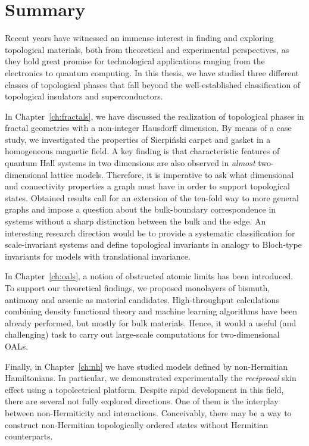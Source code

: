 \cleardoublepage{}
\chapter*{Summary}
\label{ch:summary}
Recent years have witnessed an immense interest in finding and exploring topological materials, both from theoretical and experimental perspectives, as they hold great promise for technological applications ranging from the electronics to quantum computing. In this thesis, we have studied three different classes of topological phases that fall beyond the well-established classification of topological insulators and superconductors.

In Chapter~\ref{ch:fractals}, we have discussed the realization of topological phases in fractal geometries with a non-integer Hausdorff dimension. By means of a case study, we investigated the properties of Sierpiński carpet and gasket in a homogeneous magnetic field. A key finding is that characteristic features of quantum Hall systems in two dimensions are also observed in \emph{almost} two-dimensional lattice models. Therefore, it is imperative to ask what dimensional and connectivity properties a graph must have in order to support topological states. Obtained results call for an extension of the ten-fold way to more general graphs and impose a question about the bulk-boundary correspondence in systems without a sharp distinction between the bulk and the edge. An interesting research direction would be to provide a systematic classification for scale-invariant systems and define topological invariants in analogy to Bloch-type invariants for models with translational invariance.

In Chapter~\ref{ch:oals}, a notion of obstructed atomic limits has been introduced. To support our theoretical findings, we proposed monolayers of bismuth, antimony and arsenic as material candidates. High-throughput calculations combining density functional theory and machine learning algorithms have been already performed, but mostly for bulk materials. Hence, it would a useful (and challenging) task to carry out large-scale computations for two-dimensional OALs.

Finally, in Chapter~\ref{ch:nh} we have studied models defined by non-Hermitian Hamiltonians. In particular, we demonstrated experimentally the \emph{reciprocal} skin effect using a topolectrical platform. Despite rapid development in this field, there are several not fully explored directions. One of them is the interplay between non-Hermiticity and interactions. Conceivably, there may be a way to construct non-Hermitian topologically ordered states without Hermitian counterparts.
